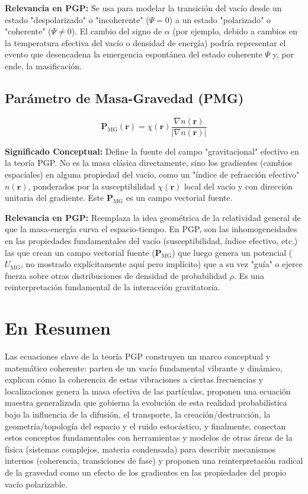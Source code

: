 \documentclass{article}
\begin{document}
\textbf{Relevancia en PGP:} Se usa para modelar la transición del vacío desde un estado "despolarizado" o "incoherente" ($\Psi = 0$) a un estado "polarizado" o "coherente" ($\Psi \neq 0$). El cambio del signo de $\alpha$ (por ejemplo, debido a cambios en la temperatura efectiva del vacío o densidad de energía) podría representar el evento que desencadena la emergencia espontánea del estado coherente $\Psi$ y, por ende, la masificación.

\subsection{Parámetro de Masa-Gravedad (PMG)}

\begin{equation*}
\mathbf{P}_{\text{MG}}(\mathbf{r}) = \chi(\mathbf{r}) \frac{\nabla n(\mathbf{r})}{\left|\nabla n(\mathbf{r})\right|}
\end{equation*}

\textbf{Significado Conceptual:} Define la fuente del campo "gravitacional" efectivo en la teoría PGP. No es la masa clásica directamente, sino los gradientes (cambios espaciales) en alguna propiedad del vacío, como un "índice de refracción efectivo" $n(\mathbf{r})$, ponderados por la susceptibilidad $\chi(\mathbf{r})$ local del vacío y con dirección unitaria del gradiente. Este $\mathbf{P}_{\text{MG}}$ es un campo vectorial fuente.

\textbf{Relevancia en PGP:} Reemplaza la idea geométrica de la relatividad general de que la masa-energía curva el espacio-tiempo. En PGP, son las inhomogeneidades en las propiedades fundamentales del vacío (susceptibilidad, índice efectivo, etc.) las que crean un campo vectorial fuente ($\mathbf{P}_{\text{MG}}$) que luego genera un potencial ($U_{\text{MG}}$, no mostrado explícitamente aquí pero implícito) que a su vez "guía" o ejerce fuerza sobre otras distribuciones de densidad de probabilidad $\rho$. Es una reinterpretación fundamental de la interacción gravitatoria.

\section*{En Resumen}

Las ecuaciones clave de la teoría PGP construyen un marco conceptual y matemático coherente: parten de un vacío fundamental vibrante y dinámico, explican cómo la coherencia de estas vibraciones a ciertas frecuencias y localizaciones genera la masa efectiva de las partículas, proponen una ecuación maestra generalizada que gobierna la evolución de esta realidad probabilística bajo la influencia de la difusión, el transporte, la creación/destrucción, la geometría/topología del espacio y el ruido estocástico, y finalmente, conectan estos conceptos fundamentales con herramientas y modelos de otras áreas de la física (sistemas complejos, materia condensada) para describir mecanismos internos (coherencia, transiciones de fase) y proponen una reinterpretación radical de la gravedad como un efecto de los gradientes en las propiedades del propio vacío polarizable.
\end{document}
